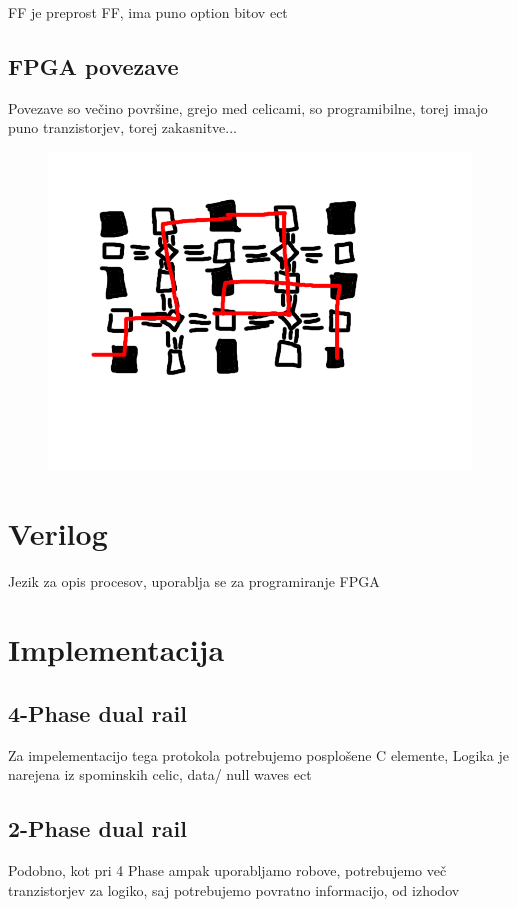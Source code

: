 FF je preprost FF, ima puno option bitov ect

\subsection{FPGA povezave}

Povezave so večino površine, grejo med celicami, so programibilne, torej imajo puno tranzistorjev, torej zakasnitve...

\begin{figure}
	\centering
	\includegraphics[width=0.7\linewidth]{slike/routing}
	\caption{}
	\label{fig:cell}
\end{figure}

\section{Verilog} \label{a}
Jezik za opis procesov, uporablja se za programiranje FPGA

\section{Implementacija} \label{a}
\subsection{4-Phase dual rail} \label{b}
Za impelementacijo tega protokola potrebujemo posplošene C elemente, Logika je narejena iz spominskih celic, data/ null waves ect

\subsection{2-Phase dual rail} \label{b}
Podobno, kot pri 4 Phase ampak uporabljamo robove, potrebujemo več tranzistorjev za logiko, saj potrebujemo povratno informacijo, od izhodov


